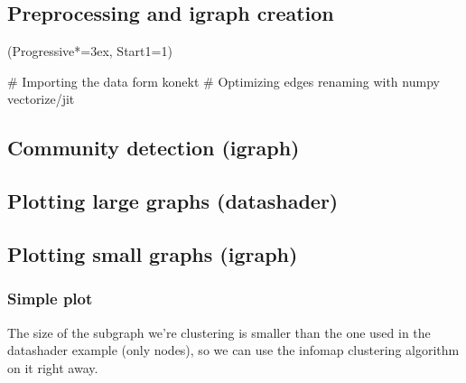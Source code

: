 \documentclass[12pt, a4paper]{article}
\let\OldEasylist\easylist
\let\OldEndEasylist\endeasylist
\renewenvironment{easylist}{%
    \OldEasylist%
    \ListProperties(Progressive*=3ex, Start1=1)%
}{%
    \OldEndEasylist%
}%
\begin{document}
\subsection{Preprocessing and igraph creation}
\begin{easylist}
# Importing the data form konekt
# Optimizing edges renaming with numpy vectorize/jit
\end{easylist}

\subsection{Community detection (igraph)}

\subsection{Plotting large graphs (datashader)}


\subsection{Plotting small graphs (igraph)}
\subsubsection{Simple plot}

The size of the subgraph we're clustering is smaller than the one used in the datashader example (only  nodes), so we can use the infomap clustering algorithm on it right away.

\end{document}
